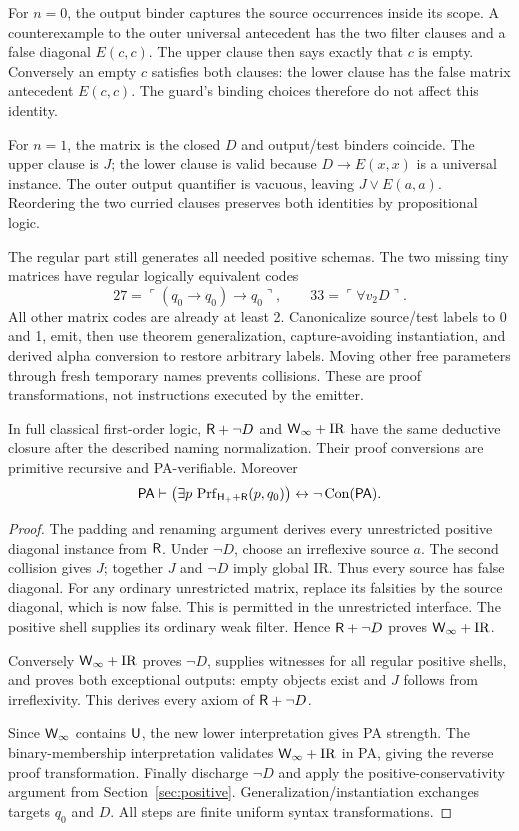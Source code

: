 For $n=0$, the output binder captures the source occurrences inside its scope. A counterexample to the outer universal antecedent has the two filter clauses and a false diagonal $E(c,c)$. The upper clause then says exactly that $c$ is empty. Conversely an empty $c$ satisfies both clauses: the lower clause has the false matrix antecedent $E(c,c)$. The guard's binding choices therefore do not affect this identity.

For $n=1$, the matrix is the closed $D$ and output/test binders coincide. The upper clause is $J$; the lower clause is valid because $D\to E(x,x)$ is a universal instance. The outer output quantifier is vacuous, leaving $J\lor E(a,a)$. Reordering the two curried clauses preserves both identities by propositional logic.

The regular part still generates all needed positive schemas. The two missing tiny matrices have regular logically equivalent codes
\[
 27=\ulcorner(q_0\to q_0)\to q_0\urcorner,
 \qquad 33=\ulcorner\forall v_2D\urcorner.
\]
All other matrix codes are already at least 2. Canonicalize source/test labels to 0 and 1, emit, then use theorem generalization, capture-avoiding instantiation, and derived alpha conversion to restore arbitrary labels. Moving other free parameters through fresh temporary names prevents collisions. These are proof transformations, not instructions executed by the emitter.

\begin{theorem}\label{thm:raw}
In full classical first-order logic, $\mathsf{R}+\neg D$ and $\mathsf{W}_{\infty}+\mathrm{IR}$ have the same deductive closure after the described naming normalization. Their proof conversions are primitive recursive and PA-verifiable. Moreover
\[
 \mathsf{PA}\vdash
 \bigl(\exists p\,\operatorname{Prf}_{\mathsf H_++\mathsf{R}}(p,q_0)\bigr)
                               \leftrightarrow\neg\operatorname{Con}(\mathsf{PA}).
\]
\end{theorem}
\begin{proof}
The padding and renaming argument derives every unrestricted positive diagonal instance from $\mathsf{R}$. Under $\neg D$, choose an irreflexive source $a$. The second collision gives $J$; together $J$ and $\neg D$ imply global $\mathrm{IR}$. Thus every source has false diagonal. For any ordinary unrestricted matrix, replace its falsities by the source diagonal, which is now false. This is permitted in the unrestricted interface. The positive shell supplies its ordinary weak filter. Hence $\mathsf{R}+\neg D$ proves $\mathsf{W}_{\infty}+\mathrm{IR}$.

Conversely $\mathsf{W}_{\infty}+\mathrm{IR}$ proves $\neg D$, supplies witnesses for all regular positive shells, and proves both exceptional outputs: empty objects exist and $J$ follows from irreflexivity. This derives every axiom of $\mathsf{R}+\neg D$.

Since $\mathsf{W}_{\infty}$ contains $\mathsf{U}$, the new lower interpretation gives PA strength. The binary-membership interpretation validates $\mathsf{W}_{\infty}+\mathrm{IR}$ in PA, giving the reverse proof transformation. Finally discharge $\neg D$ and apply the positive-conservativity argument from Section~\ref{sec:positive}. Generalization/instantiation exchanges targets $q_0$ and $D$. All steps are finite uniform syntax transformations.
\end{proof}

